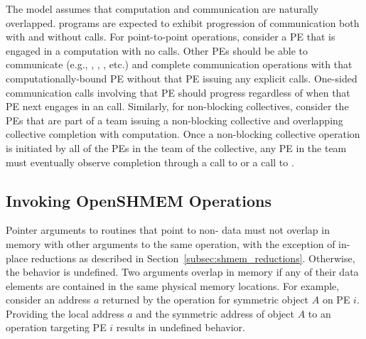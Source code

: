The \openshmem model assumes that computation and communication are naturally
overlapped. \openshmem programs are expected to exhibit progression of
communication both with and without \openshmem calls. For point-to-point
operations, consider a \ac{PE} that is
engaged in a computation with no \openshmem calls. Other \acp{PE} should be able
to communicate (e.g., , , , etc.) and
complete communication operations with that computationally-bound \ac{PE}
without that \ac{PE} issuing any explicit \openshmem calls. One-sided \openshmem
communication calls involving that \ac{PE} should progress regardless of when
that \ac{PE} next engages in an \openshmem call. Similarly,
for non-blocking collectives, consider the \acp{PE} that are part of a team
issuing a non-blocking collective and overlapping collective completion with
computation. Once a non-blocking collective operation is initiated by
all of the \acp{PE} in the team of the collective, any \ac{PE} in the team must
eventually observe completion through a call to  or a
call to .


\subsection{Invoking OpenSHMEM Operations}\label{subsec:invoking_openshmem_operations}

Pointer arguments to \openshmem routines that point to non- data must not
overlap in memory with other arguments to the same \openshmem operation, with
the exception of in-place reductions as described in Section~\ref{subsec:shmem_reductions}.
Otherwise, the behavior is undefined.  Two arguments overlap in memory if any
of their data elements are contained in the same physical memory locations.
For example, consider an address $a$ returned by the  operation
for symmetric object $A$ on \ac{PE} $i$.  Providing the local address $a$ and
the symmetric address of object $A$ to an \openshmem operation targeting
\ac{PE} $i$ results in undefined behavior.

